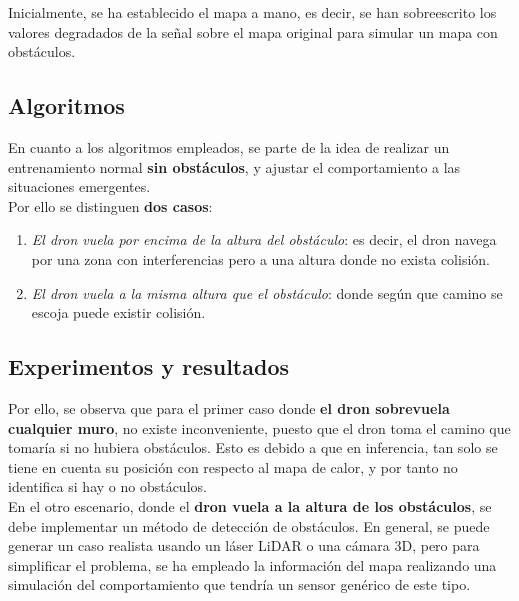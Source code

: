 
Inicialmente, se ha establecido el mapa a mano, es decir, se han sobreescrito los valores degradados de la señal sobre el mapa original para simular un mapa con obstáculos.\\

\subsection{Algoritmos}
\label{subsec:algoritmo_sfo}

En cuanto a los algoritmos empleados, se parte de la idea de realizar un entrenamiento normal \textbf{sin obstáculos}, y ajustar el comportamiento a las situaciones emergentes.\\

Por ello se distinguen \textbf{dos casos}:

\begin{enumerate}
    \item \emph{El dron vuela por encima de la altura del obstáculo}: es decir, el dron navega por una zona con interferencias pero a una altura donde no exista colisión.

    \item \emph{El dron vuela a la misma altura que el obstáculo}: donde según que camino se escoja puede existir colisión.
\end{enumerate}

\subsection{Experimentos y resultados}
\label{subsec:experimentos_sfo}

Por ello, se observa que para el primer caso donde \textbf{el dron sobrevuela cualquier muro}, no existe inconveniente, puesto que el dron toma el camino que tomaría si no hubiera obstáculos. Esto es debido a que en inferencia, tan solo se tiene en cuenta su posición con respecto al mapa de calor, y por tanto no identifica si hay o no obstáculos.\\

En el otro escenario, donde el \textbf{dron vuela a la altura de los obstáculos}, se debe implementar un método de detección de obstáculos. En general, se puede generar un caso realista usando un láser LiDAR o una cámara 3D, pero para simplificar el problema, se ha empleado la información del mapa realizando una simulación del comportamiento que tendría un sensor genérico de este tipo.\\


